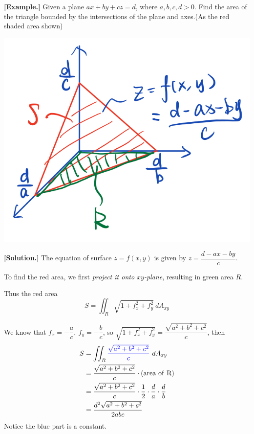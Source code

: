 \documentclass[11pt, a4paper]{MATH2023}
\newcommand{\eg}{\textbf{[Example.] }}
\newcommand{\sol}{\textbf{[Solution.] }}
\begin{document}
\begin{spacing}{1.3}
    \eg Given a plane $ax+by+cz=d$, where $a,b,c,d>0$. Find the area of the triangle bounded 
    by the intersections of the plane and axes.(As the red shaded area shown)

    \begin{center}
        \includegraphics[scale=0.25]{images/Ch14-surface-area-eg1.jpeg}
    \end{center}

    \sol The equation of surface $z=f(x,y)$ is given by $z=\dfrac{d-ax-by}{c}$.

    To find the red area, we first {\it project it onto $xy$-plane}, resulting in green area $R$.

    Thus the red area $$S=\iint_R\sqrt{1+f_x^2+f_y^2}\ dA_{xy}$$

    We know that $f_x=-\dfrac{a}{c},\ f_y=-\dfrac{b}{c}$, so 
    $\sqrt{1+f_x^2+f_y^2}=\dfrac{\sqrt{a^2+b^2+c^2}}{c}$, then
    \begin{align*}
        S &= \iint_R{\blue \dfrac{\sqrt{a^2+b^2+c^2}}{c}}\ dA_{xy}\\
          &= \dfrac{\sqrt{a^2+b^2+c^2}}{c}\cdot {\rm (area\ of\ R)}\\
          &= \dfrac{\sqrt{a^2+b^2+c^2}}{c}\cdot \frac{1}{2}\cdot \frac{d}{a}\cdot \frac{d}{b}\\
          &= \frac{d^2\sqrt{a^2+b^2+c^2}}{2abc}
    \end{align*}
    Notice the blue part is a constant.


\end{spacing}
\end{document}
